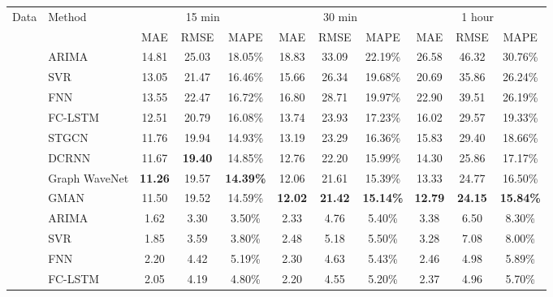 \documentclass[letterpaper]{article} \usepackage{aaai20}  \usepackage{times}  \usepackage{helvet} \usepackage{courier}  \usepackage[hyphens]{url}  \usepackage{graphicx} \usepackage{amsmath}
\begin{document}
\begin{table*}
	\centering
	\begin{tabular*}{\hsize}{@{}@{\extracolsep{\fill}}ll|ccc|ccc|ccc@{}}
		\toprule
		\multirow{2}{*}{Data}					& \multirow{2}{*}{Method}	& \multicolumn{3}{c}{15 min}	& \multicolumn{3}{c}{30 min}	& \multicolumn{3}{c}{1 hour}	\\
		&							& MAE	& RMSE	& MAPE			& MAE	& RMSE	& MAPE			& MAE	& RMSE	& MAPE 			\\
		\midrule
		\multirow{8}{*}{\rotatebox{90}{Xiamen}} & ARIMA          			& 14.81	& 25.03	& 18.05\%		& 18.83	& 33.09	& 22.19\%		& 26.58	& 46.32	& 30.76\%		\\
		& SVR                       & 13.05 & 21.47 & 16.46\%       & 15.66 & 26.34 & 19.68\%       & 20.69 & 35.86 & 26.24\%       \\
		& FNN                       & 13.55 & 22.47 & 16.72\%       & 16.80 & 28.71 & 19.97\%       & 22.90 & 39.51 & 26.19\%       \\
		& FC-LSTM       			& 12.51 & 20.79 & 16.08\%       & 13.74 & 23.93 & 17.23\%       & 16.02 & 29.57 & 19.33\%       \\
		& STGCN                     & 11.76 & 19.94 & 14.93\%       & 13.19 & 23.29 & 16.36\%       & 15.83 & 29.40 & 18.66\%       \\
		& DCRNN                     & 11.67 & \textbf{19.40} & 14.85\%       & 12.76 & 22.20 & 15.99\%       & 14.30 & 25.86 & 17.17\%       \\
		& Graph WaveNet             & \textbf{11.26} & 19.57 & \textbf{14.39\%}       & 12.06 & 21.61 & 15.39\%       & 13.33 & 24.77 & 16.50\%		\\
		& GMAN                      & 11.50 & 19.52 & 14.59\%       & \textbf{12.02} & \textbf{21.42} & \textbf{15.14\%}       & \textbf{12.79} & \textbf{24.15} & \textbf{15.84\%}		\\
		\midrule	
		\multirow{8}{*}{\rotatebox{90}{PeMS}} 	& ARIMA          			& 1.62	& 3.30	& 3.50\%		& 2.33	& 4.76	& 5.40\%		& 3.38	& 6.50	& 8.30\%		\\
		& SVR                       & 1.85  & 3.59  & 3.80\%        & 2.48  & 5.18  & 5.50\%        & 3.28  & 7.08  & 8.00\%		\\
		& FNN                       & 2.20  & 4.42  & 5.19\%        & 2.30  & 4.63  & 5.43\%        & 2.46  & 4.98  & 5.89\%        \\
		& FC-LSTM       			& 2.05  & 4.19  & 4.80\%        & 2.20  & 4.55  & 5.20\%        & 2.37  & 4.96  & 5.70\%        \\

\end{tabular*}
\end{table*}
\end{document}
